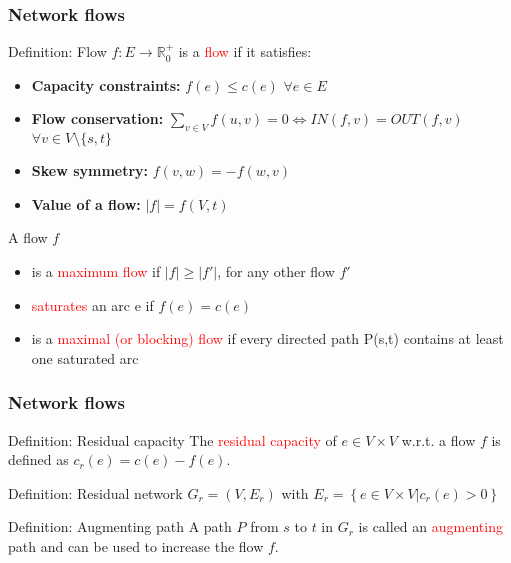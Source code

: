 \documentclass{beamer}
\begin{document}
\begin{frame}[shrink]
	\frametitle{Network flows}
	\begin{block}{Definition: Flow}
	$f:E \rightarrow \mathbb{R}_0^{+}$ is a \textcolor{red}{flow} if it satisfies:
	\begin{itemize}
		\item \textbf{Capacity constraints:} $f(e) \leq c(e)$ $\forall e \in E$
		\item \textbf{Flow conservation:} 
		$ \sum\limits_{v \in V} f(u,v) =  0 \Leftrightarrow IN(f,v) = OUT(f,v)$ $\forall v \in V \setminus \{s,t\}$
		\item \textbf{Skew symmetry:} $f(v,w) = -f(w,v)$
		\item \textbf{Value of a flow:} $\lvert f\rvert = f(V,t)$ 
	\end{itemize}
	\end{block}
	
	\begin{block}{A flow $f$}
	\begin{itemize}
		\item is a \textcolor{red}{maximum flow} if $\lvert f\rvert \geq \lvert f'\rvert$, for any other flow $f'$
		\item \textcolor{red}{saturates} an arc e if $f(e) = c(e)$
		\item is a \textcolor{red}{maximal (or blocking) flow} if every directed path P(s,t) contains at least one saturated arc
	\end{itemize}
	\end{block}
\end{frame}

\begin{frame}
	\frametitle{Network flows}
	\begin{block}{Definition: Residual capacity}
		The \textcolor{red}{residual capacity} of $e \in V \times V$ w.r.t. a flow $f$ is defined as $c_r(e) = c(e) - f(e)$. \\
	\end{block}
	\begin{block}{Definition: Residual network}
		$G_r = (V, E_r)$ with $E_r = \left\{e \in V \times V \lvert c_r(e) > 0\right\}$
	\end{block}

	\begin{block}{Definition: Augmenting path}
		A path $P$ from $s$ to $t$ in $G_r$ is called an \textcolor{red}{augmenting} path and can be used to increase the flow $f$.
	\end{block}
\end{frame}
\end{document}
